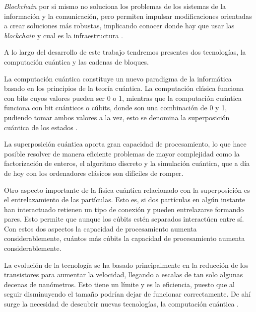 \begin{itemize}
\textit{Blockchain} por si mismo no soluciona los problemas de los sistemas de la información y la comunicación, pero permiten impulsar modificaciones orientadas a crear soluciones más robustas, implicando conocer donde hay que usar las \textit{blockchain} y cual es la infraestructura \cite{blockchain}.


	
	
	A lo largo del desarrollo de este trabajo tendremos presentes dos tecnologías, la computación cuántica y las cadenas de bloques. 

La computación cuántica constituye un nuevo paradigma de la informática basado en los principios de la teoría cuántica. La computación clásica funciona con bits cuyos valores pueden ser 0 o 1, mientras que la computación cuántica funciona con bit cuánticos o cúbits, donde son una combinación de 0 y 1, pudiendo tomar ambos valores a la vez, esto se denomina la superposición cuántica de los estados \cite{computacioncuantica-criptografia}.

La superposición cuántica aporta gran capacidad de procesamiento, lo que hace posible resolver de manera eficiente problemas de mayor complejidad como la factorización de enteros, el algoritmo discreto y la simulación cuántica, que a día de hoy con los ordenadores clásicos son difíciles de romper. 

Otro aspecto importante de la física cuántica relacionado con la superposición es el entrelazamiento de las partículas\cite{cumputacioncuanticaclasica}. Esto es, si dos partículas en algún instante han interactuado retienen un tipo de conexión y pueden entrelazarse formando pares. Esto permite que aunque los cúbits estén separados interactúen entre sí. Con estos dos aspectos la capacidad de procesamiento aumenta considerablemente, cuántos más cúbits la capacidad de procesamiento aumenta considerablemente.

La evolución de la tecnología se ha basado principalmente en la reducción de los transistores para aumentar la velocidad, llegando a escalas de tan solo algunas decenas de nanómetros. Esto tiene un límite y es la eficiencia, puesto que al seguir disminuyendo el tamaño podrían dejar de funcionar correctamente. De ahí surge la necesidad de descubrir nuevas tecnologías, la computación cuántica \cite{computacioncuanticawiki}.


\end{itemize}
